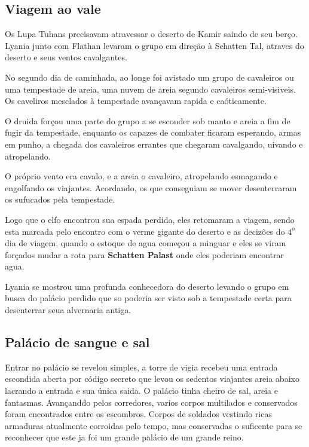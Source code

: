 \subsection{Viagem ao vale}

Os Lupa Tuhans precisavam atravessar o deserto de Kamir
saindo de seu ber\c{c}o. Lyania junto com Flathan
levaram o grupo em dire\c{c}\~ao \`a Schatten Tal,
atraves do deserto e seus ventos cavalgantes.

No segundo dia de caminhada, ao longe foi avistado um grupo
de cavaleiros ou uma tempestade de areia, uma nuvem
de areia segundo cavaleiros semi-visiveis.
Os caveliros mesclados \`a tempestade avan\c{c}avam
rapida e ca\'oticamente.

O druida for\c{c}ou uma parte do grupo a se esconder sob manto e areia
a fim de fugir da tempestade, enquanto os capazes de combater
ficaram esperando, armas em punho, a chegada dos cavaleiros errantes
que chegaram cavalgando, uivando e atropelando.

O pr\'oprio vento era cavalo, e a areia o cavaleiro,
atropelando esmagando e engolfando os viajantes. Acordando,
os que conseguiam se mover desenterraram os sufucados pela
tempestade.


Logo que o elfo encontrou sua espada perdida, eles retomaram a viagem,
sendo esta marcada pelo encontro com o verme gigante do deserto e
as deciz\~oes do \(4^o\) dia de viagem, quando o estoque de
agua come\c{c}ou a minguar e eles se viram for\c{c}ados mudar a rota
para \textbf{Schatten Palast} onde eles poderiam encontrar agua.

Lyania se mostrou uma profunda conhecedora do deserto
levando o grupo em busca do pal\'acio perdido que so poderia
ser visto sob a tempestade certa para desenterrar seua alvernaria antiga.

\subsection{Pal\'acio de sangue e sal}
Entrar no pal\'acio se revelou simples, a torre de vigia recebeu uma entrada
escondida aberta por c\'odigo secreto que levou os sedentos viajantes areia abaixo
lacrando a entrada e sua \'unica saida.
O pal\'acio tinha cheiro de sal, areia e fantasmas.
Avan\c{c}anddo pelos corredores, varios corpos multilados e conservados
foram encontrados entre os escombros. Corpos de soldados vestindo ricas
armaduras atualmente corroidas pelo tempo, mas conservadas o suficente
para se reconhecer que este ja foi um grande pal\'acio de um grande reino.

